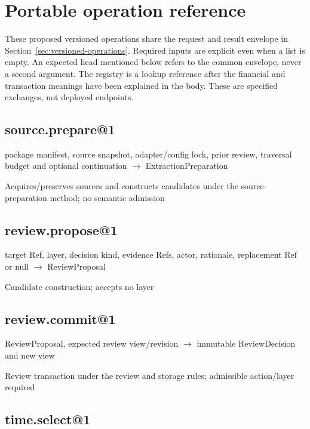 \chapter{Portable operation reference}
\label{app:portable-interfaces}

These proposed versioned operations share the request and result envelope in
Section~\ref{sec:versioned-operations}. Required inputs are explicit even when
a list is empty. An expected head mentioned below refers to the common envelope,
never a second argument. The registry is a lookup reference after the financial
and transaction meanings have been explained in the body. These are specified
exchanges, not deployed endpoints.

\hypertarget{source.prepare1}{%
\section{source.prepare@1}\label{source.prepare1}}

package manifest, source snapshot, adapter/config lock, prior review, traversal budget and optional continuation \ensuremath{\rightarrow} ExtractionPreparation

Acquires/preserves sources and constructs candidates under the source-preparation method; no semantic admission

\hypertarget{review.propose1}{%
\section{review.propose@1}\label{review.propose1}}

target Ref, layer, decision kind, evidence Refs, actor, rationale, replacement Ref or null \ensuremath{\rightarrow} ReviewProposal

Candidate construction; accepts no layer

\hypertarget{review.commit1}{%
\section{review.commit@1}\label{review.commit1}}

ReviewProposal, expected review view/revision \ensuremath{\rightarrow} immutable ReviewDecision and new view

Review transaction under the review and storage rules; admissible action/layer required

\hypertarget{time.select1}{%
\section{time.select@1}\label{time.select1}}

